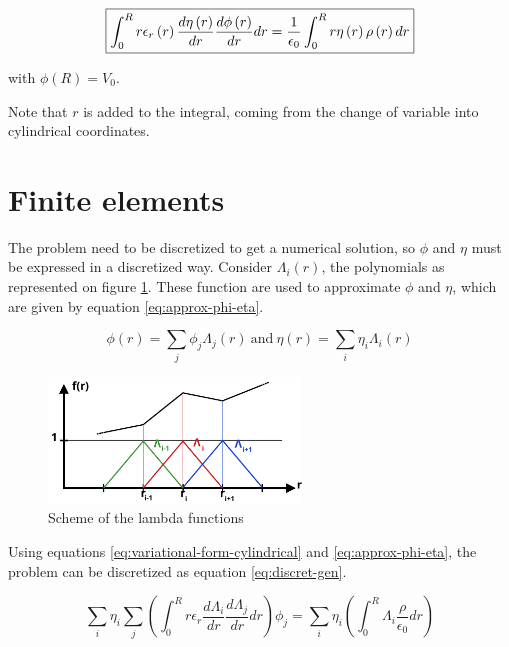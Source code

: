 \documentclass[a4paper,12pt,twoside]{article}
\newcommand{\bracket}[1]{\left(#1\right)}
\begin{document}
    \begin{equation}
      \centering
      \boxed{\int_0^R r\epsilon_r\bracket{r}\frac{d\eta\bracket{r}}{dr}\frac{d\phi\bracket{r}}{dr}dr = \frac{1}{\epsilon_0}\int_0^R r\eta\bracket{r}\rho\bracket{r} dr}
      \label{eq:variational-form-cylindrical}
    \end{equation}

    with $\phi\bracket{R} = V_0$.

    Note that $r$ is added to the integral, coming from the change of variable into cylindrical coordinates.

\section{Finite elements}
  The problem need to be discretized to get a numerical solution, so $\phi$ and $\eta$ must be expressed in a discretized way.
  Consider $\Lambda_i\bracket{r}$, the polynomials as represented on figure \ref{fig:lambda}.
  These function are used to approximate $\phi$ and $\eta$, which are given by equation \eqref{eq:approx-phi-eta}.

  \begin{equation}
    \phi\bracket{r}=\sum_j\phi_j\Lambda_j\bracket{r}~\text{and}~\eta\bracket{r}=\sum_i\eta_i\Lambda_i\bracket{r}
    \label{eq:approx-phi-eta} %
  \end{equation}

  \begin{figure}[h]
    \centering
    \includegraphics[width=0.6\textwidth]{graphs/lambda.pdf}
    \caption{Scheme of the lambda functions}
    \label{fig:lambda}
  \end{figure}

  Using equations \eqref{eq:variational-form-cylindrical} and \eqref{eq:approx-phi-eta}, the problem can be discretized as equation \eqref{eq:discret-gen}.

  \begin{equation}
    \sum_i\eta_i\sum_j\bracket{\int_0^R r\epsilon_r\frac{d\Lambda_i}{dr}\frac{d\Lambda_j}{dr}dr}\phi_j = \sum_i\eta_i\bracket{\int_0^R\Lambda_i\frac{\rho}{\epsilon_0}dr}
    \label{eq:discret-gen}
  \end{equation}
\end{document}
